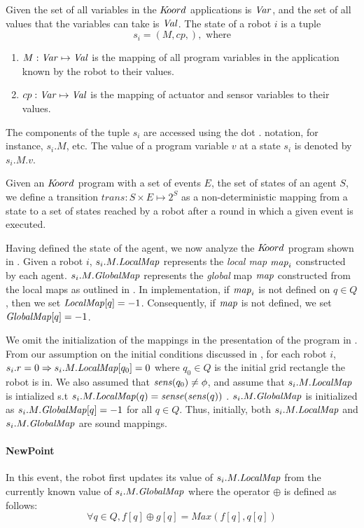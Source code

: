 \noindent
Given the set of all variables in the $K\kern-2pt oord$ applications is $\mathit{Var}$, and the set of all values that the variables can take is $\mathit{Val}$. The state of a robot $i$ is a tuple $$s_i = ( M, cp,), \mbox{ where}$$
\begin{enumerate}
    \item $M : \mathit{Var} \mapsto \mathit{Val}$ is the mapping of all program variables in the application known by the robot to their values.
    \item $cp : \mathit{Var} \mapsto \mathit{Val}$ is the mapping of actuator and sensor variables to their values.
\end{enumerate}
The components of the tuple $s_i$ are accessed using the dot $.$ notation, for instance, $s_i.M$, etc. The value of a program variable $v$ at a state $s_i$ is denoted by $s_i.M.v$.

Given an $K\kern-2pt oord$ program with a set of events $E$, the set of states of an agent $S$, we define a transition $\mathit{trans}: S \times E \mapsto 2^S$ as a non-deterministic mapping from a state to a set of states reached by a robot after a round in which a given event is executed.

Having defined the state of the agent, we now analyze the $K\kern-2pt oord$ program shown in . Given a robot $i$, $s_i.M.\mathit{LocalMap}$ represents the \emph{local map} $\mathit{map}_i$ constructed by each agent. $s_i.M.\mathit{GlobalMap}$ represents the \emph{global} map $\mathit{map}$ constructed from the local maps as outlined in . In implementation, if $\mathit{map}_i$ is not defined on $q\in Q$, then we set $\mathit{LocalMap}[q] = -1$. Consequently, if $\mathit{map}$ is not defined, we set $\mathit{GlobalMap}[q] = -1$.


We omit the initialization of the mappings in the presentation of the program in . From our assumption on the initial conditions discussed in , for each robot $i$, $s_i.r = 0\Rightarrow s_i.M.\mathit{LocalMap}[q_0] = 0$ where $q_0\in Q$ is the initial grid rectangle the robot is in. We also assumed that $\mathit{sens}(q_0)\neq \phi$, and assume that $s_i.M.\mathit{LocalMap}$ is intialized s.t $s_i.M.\mathit{LocalMap}(q) = \mathit{sense}(\mathit{sens}(q))$ . $s_i.M.\mathit{GlobalMap}$ is initialized as $s_i.M.\mathit{GlobalMap}[q] = -1$ for all $q\in Q$. Thus, initially, both $s_i.M.\mathit{LocalMap}$ and $s_i.M.\mathit{GlobalMap}$ are sound mappings.

\paragraph{NewPoint}
In this event, the robot first updates its value of $s_i.M.\mathit{LocalMap}$ from the currently known value of $s_i.M.\mathit{GlobalMap}$ where the operator $\oplus$ is defined as follows:
$$\forall q \in Q, f[q] \oplus g[q] = \mathit{Max}(f[q], q[q])$$

